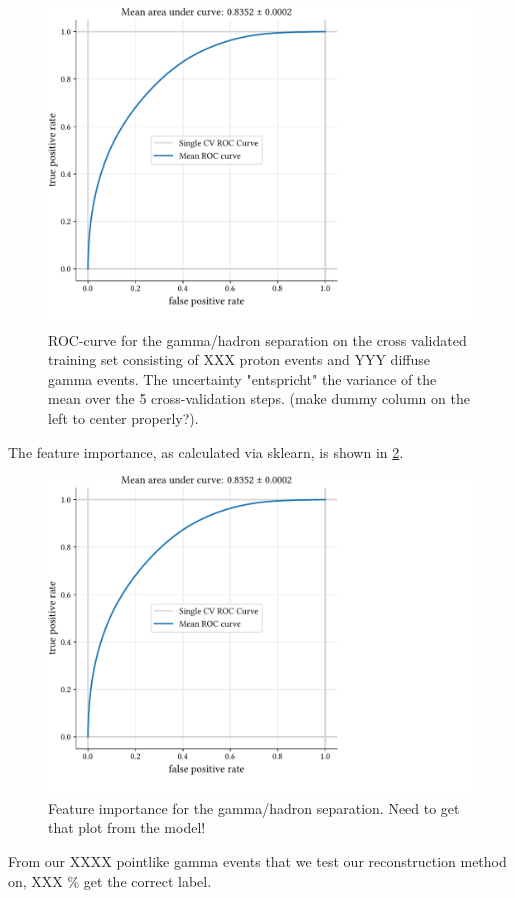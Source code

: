 \begin{figure}
    \centering
    \includegraphics[page=1, width=.8\textwidth]{../analysis/plots/cross_val_sep_perf_plot.pdf}
    \caption{ROC-curve for the gamma/hadron separation on the cross validated training set 
    consisting of XXX proton events and YYY diffuse gamma events.
    The uncertainty "entspricht" the variance of the mean over the 5 cross-validation steps. 
    (make dummy column on the left to center properly?).}
    \label{fig:gh_roc}
\end{figure}


The feature importance, as calculated via sklearn, is shown in \ref{fig:gh_features}.
\begin{figure}
    \centering
    \includegraphics[page=1, width=.8\textwidth]{../analysis/plots/cross_val_sep_perf_plot.pdf}
    \caption{Feature importance for the gamma/hadron separation. Need to get that plot from the model!}
    \label{fig:gh_features}
\end{figure}


From our XXXX pointlike gamma events that we test our reconstruction method on, 
XXX \% get the correct label.
